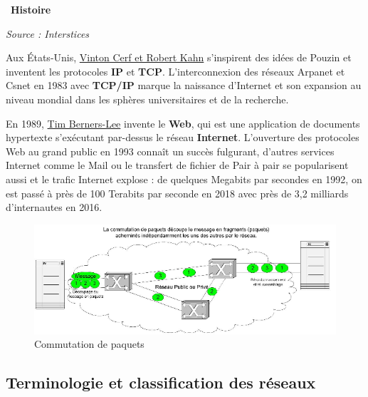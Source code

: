 \documentclass[
  11pt,
]{article}
\newcounter{rque}
\newcounter{logi}
\newcounter{histo}
\newenvironment{histoire}[1]
{\par \medskip   \addtocounter{histo}{1} \noindent  
 \begin {bclogo}[couleur = blue!10 , arrondi =0.1,logo=\bchorloge, marge=4] {~\textbf{Histoire} \textbf{\thehisto} {\itshape #1} }  \par}
{
\end{bclogo}
 \par \bigskip }
\begin{document}
\begin{histoire}{}
\emph{Source : Interstices}

Aux États-Unis, \href{https://fr.wikipedia.org/wiki/Vint_Cerf}{Vinton
Cerf et Robert Kahn} s'inspirent des idées de Pouzin et inventent les
protocoles \textbf{IP} et \textbf{TCP}. L'interconnexion des réseaux
Arpanet et Csnet en 1983 avec \textbf{TCP/IP} marque la naissance
d'Internet et son expansion au niveau mondial dans les sphères
universitaires et de la recherche.

En 1989,
\href{https://interstices.info/les-debuts-du-web-sous-loeil-du-w3c/}{Tim
Berners-Lee} invente le \textbf{Web}, qui est une application de
documents hypertexte s'exécutant par-dessus le réseau \textbf{Internet}.
L'ouverture des protocoles Web au grand public en 1993 connaît un succès
fulgurant, d'autres services Internet comme le Mail ou le transfert de
fichier de Pair à pair se popularisent aussi et le trafic Internet
explose : de quelques Megabits par secondes en 1992, on est passé à près
de 100 Terabits par seconde en 2018 avec près de 3,2 milliards
d'internautes en 2016.

\end{histoire}

\begin{figure}
\centering
\includegraphics{images/commutationpaquets.png}
\caption{Commutation de paquets}
\end{figure}

\hypertarget{terminologie-et-classification-des-ruxe9seaux}{%
\subsection{Terminologie et classification des
réseaux}\label{terminologie-et-classification-des-ruxe9seaux}}
\end{document}
